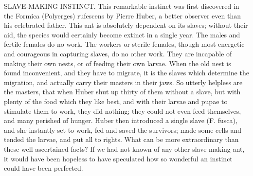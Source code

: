 SLAVE-MAKING INSTINCT.
This remarkable instinct was first discovered in the Formica (Polyerges) rufescens by Pierre Huber, a better observer even than his celebrated father. This ant is absolutely dependent on its slaves; without their aid, the species would certainly become extinct in a single year. The males and fertile females do no work. The workers or sterile females, though most energetic and courageous in capturing slaves, do no other work. They are incapable of making their own nests, or of feeding their own larvae. When the old nest is found inconvenient, and they have to migrate, it is the slaves which determine the migration, and actually carry their masters in their jaws. So utterly helpless are the masters, that when Huber shut up thirty of them without a slave, but with plenty of the food which they like best, and with their larvae and pupae to stimulate them to work, they did nothing; they could not even feed themselves, and many perished of hunger. Huber then introduced a single slave (F. fusca), and she instantly set to work, fed and saved the survivors; made some cells and tended the larvae, and put all to rights. What can be more extraordinary than these well-ascertained facts? If we had not known of any other slave-making ant, it would have been hopeless to have speculated how so wonderful an instinct could have been perfected.
